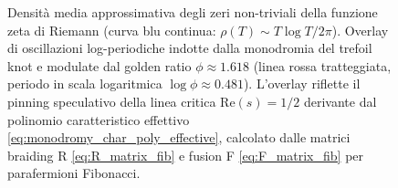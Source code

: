\documentclass[11pt,a4paper]{article}
\theoremstyle{plain}
\theoremstyle{definition}
\begin{document}
\begin{figure}[H]
\centering
{}
\caption{Densità media approssimativa degli zeri non-triviali della funzione zeta di Riemann (curva blu continua: $\rho(T) \sim T \log T / 2\pi$). Overlay di oscillazioni log-periodiche indotte dalla monodromia del trefoil knot e modulate dal golden ratio $\phi \approx 1.618$ (linea rossa tratteggiata, periodo in scala logaritmica $\log \phi \approx 0.481$). L'overlay riflette il pinning speculativo della linea critica $\mathrm{Re}(s) = 1/2$ derivante dal polinomio caratteristico effettivo \eqref{eq:monodromy_char_poly_effective}, calcolato dalle matrici braiding R \eqref{eq:R_matrix_fib} e fusion F \eqref{eq:F_matrix_fib} per parafermioni Fibonacci.}
\label{fig:zeta-density-monodromy}
\end{figure}
\end{document}
